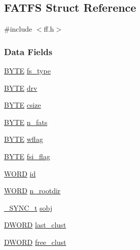 \subsection{F\+A\+T\+F\+S Struct Reference}
\label{struct_f_a_t_f_s}


{\ttfamily \#include $<$ff.\+h$>$}

\subsubsection*{Data Fields}
\begin{DoxyCompactItemize}
\item 
\hyperlink{integer_8h_a4ae1dab0fb4b072a66584546209e7d58}{B\+Y\+T\+E} \hyperlink{struct_f_a_t_f_s_add27d97babe807b573eac98a71dc4ae5}{fs\+\_\+type}
\item 
\hyperlink{integer_8h_a4ae1dab0fb4b072a66584546209e7d58}{B\+Y\+T\+E} \hyperlink{struct_f_a_t_f_s_a6a791560e2687e8b1569bfce61208d2d}{drv}
\item 
\hyperlink{integer_8h_a4ae1dab0fb4b072a66584546209e7d58}{B\+Y\+T\+E} \hyperlink{struct_f_a_t_f_s_a504a1175f6dcc9a854b9da94463bd108}{csize}
\item 
\hyperlink{integer_8h_a4ae1dab0fb4b072a66584546209e7d58}{B\+Y\+T\+E} \hyperlink{struct_f_a_t_f_s_a56716c7e7ac10cf46e73ffb2a2e9b545}{n\+\_\+fats}
\item 
\hyperlink{integer_8h_a4ae1dab0fb4b072a66584546209e7d58}{B\+Y\+T\+E} \hyperlink{struct_f_a_t_f_s_a647e43c9ccae94b7274793d1909897de}{wflag}
\item 
\hyperlink{integer_8h_a4ae1dab0fb4b072a66584546209e7d58}{B\+Y\+T\+E} \hyperlink{struct_f_a_t_f_s_a84e9cdc5a6a8e33ea7ec192058abf161}{fsi\+\_\+flag}
\item 
\hyperlink{integer_8h_a197942eefa7db30960ae396d68339b97}{W\+O\+R\+D} \hyperlink{struct_f_a_t_f_s_a417095d7c20d56d417dc0998e0dd5a5c}{id}
\item 
\hyperlink{integer_8h_a197942eefa7db30960ae396d68339b97}{W\+O\+R\+D} \hyperlink{struct_f_a_t_f_s_a189a00aa038044ffad0fc7f7dcf2aae1}{n\+\_\+rootdir}
\item 
\hyperlink{ffconf_8h_a9a3f0670343e51652dd12b18fa90a9eb}{\+\_\+\+S\+Y\+N\+C\+\_\+t} \hyperlink{struct_f_a_t_f_s_a271135f02bd461d14e7db84ea566aa33}{sobj}
\item 
\hyperlink{integer_8h_ad342ac907eb044443153a22f964bf0af}{D\+W\+O\+R\+D} \hyperlink{struct_f_a_t_f_s_ad315def289218e26ab78ff90fde700d1}{last\+\_\+clust}
\item 
\hyperlink{integer_8h_ad342ac907eb044443153a22f964bf0af}{D\+W\+O\+R\+D} \hyperlink{struct_f_a_t_f_s_a5fb49e6ac511bd97eaffdd636d0e4165}{free\+\_\+clust}

\end{DoxyCompactItemize}
